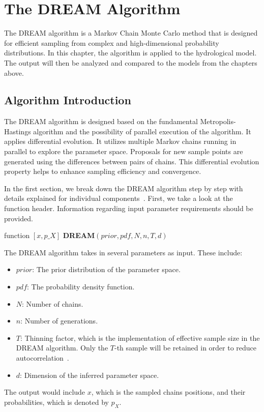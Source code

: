 \chapter{The DREAM Algorithm}
The DREAM algorithm is a Markov Chain Monte Carlo method that is designed for efficient sampling from complex and high-dimensional probability distributions. In this chapter, the algorithm is applied to the hydrological model. The output will then be analyzed and compared to the models from the chapters above.

\section{Algorithm Introduction}
The DREAM algorithm is designed based on the fundamental Metropolis-Hastings algorithm and the possibility of parallel execution of the algorithm. It applies differential evolution. It utilizes multiple Markov chains running in parallel to explore the parameter space. Proposals for new sample points are generated using the differences between pairs of chains. This differential evolution property helps to enhance sampling efficiency and convergence. 


In the first section, we break down the DREAM algorithm step by step with details explained for individual components~\cite{dream}. First, we take a look at the function header. Information regarding input parameter requirements should be provided.

\begin{algorithm}[H]
function $[x, p\_X]$ \gets \textbf{DREAM}$(prior, pdf, N, n, T, d)$
\end{algorithm}

The DREAM algorithm takes in several parameters as input. These include:
\begin{itemize}
    \item $prior$: The prior distribution of the parameter space.
    \item $pdf$: The probability density function.
    \item $N$: Number of chains.
    \item $n$: Number of generations.
    \item $T$: Thinning factor, which is the implementation of effective sample size in the DREAM algorithm. Only the $T$-th sample will be retained in order to reduce autocorrelation~\cite{dream}.
    \item $d$: Dimension of the inferred parameter space.
\end{itemize}
The output would include $x$, which is the sampled chains positions, and their probabilities, which is denoted by $p_X$.


